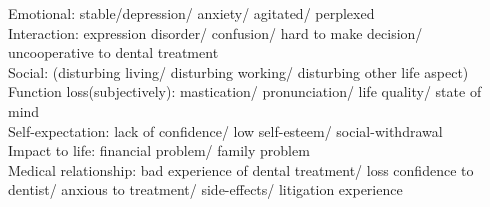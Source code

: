 \documentclass[12pt, a4paper]{article}
\begin{document}
\begin{outline}

\1 Emotional: stable/depression/ anxiety/ agitated/ perplexed\\
\1 Interaction: expression disorder/ confusion/ hard to make decision/ uncooperative to dental treatment\\
\1 Social: (disturbing living/ disturbing working/ disturbing other life aspect)\\
\1 Function loss(subjectively): mastication/ pronunciation/ life quality/ state of mind\\
\1 Self-expectation: lack of confidence/ low self-esteem/ social-withdrawal\\
\1 Impact to life: financial problem/ family problem\\
\1 Medical relationship: bad experience of dental treatment/ loss confidence to dentist/ anxious to treatment/ side-effects/ litigation experience\\[0.1cm]

\end{outline}


\end{document}
